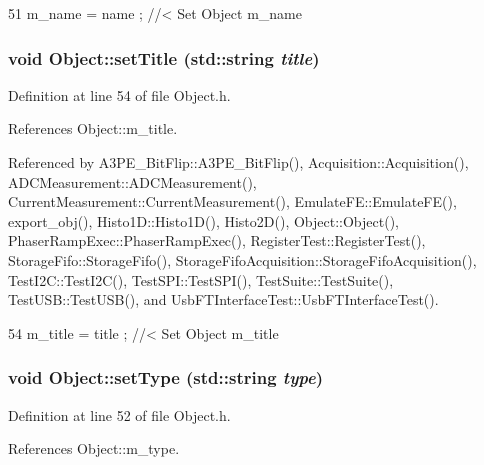 \begin{DoxyCode}
51 { m_name  = name  ; } //< Set Object m_name
\end{DoxyCode}
\hypertarget{classObject_a89557dbbad5bcaa02652f5d7fa35d20f}{
\subsubsection[{setTitle}]{\setlength{\rightskip}{0pt plus 5cm}void Object::setTitle (std::string {\em title})}}
\label{classObject_a89557dbbad5bcaa02652f5d7fa35d20f}


Definition at line 54 of file Object.h.

References Object::m\_\-title.

Referenced by A3PE\_\-BitFlip::A3PE\_\-BitFlip(), Acquisition::Acquisition(), ADCMeasurement::ADCMeasurement(), CurrentMeasurement::CurrentMeasurement(), EmulateFE::EmulateFE(), export\_\-obj(), Histo1D::Histo1D(), Histo2D(), Object::Object(), PhaserRampExec::PhaserRampExec(), RegisterTest::RegisterTest(), StorageFifo::StorageFifo(), StorageFifoAcquisition::StorageFifoAcquisition(), TestI2C::TestI2C(), TestSPI::TestSPI(), TestSuite::TestSuite(), TestUSB::TestUSB(), and UsbFTInterfaceTest::UsbFTInterfaceTest().


\begin{DoxyCode}
54 { m_title = title ; } //< Set Object m_title
\end{DoxyCode}
\hypertarget{classObject_aae534cc9d982bcb9b99fd505f2e103a5}{
\subsubsection[{setType}]{\setlength{\rightskip}{0pt plus 5cm}void Object::setType (std::string {\em type})}}
\label{classObject_aae534cc9d982bcb9b99fd505f2e103a5}


Definition at line 52 of file Object.h.

References Object::m\_\-type.

